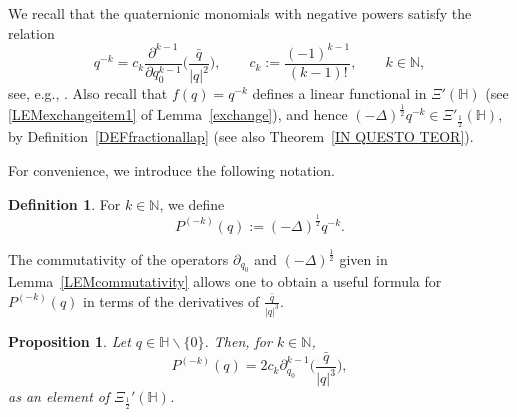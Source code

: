\documentclass[reqno,11pt]{amsart}
\newtheorem{proposition}[theorem]{Proposition}
\theoremstyle{definition}
\newtheorem{definition}[theorem]{Definition}
\begin{document}
We recall that the quaternionic monomials with negative powers satisfy the relation
\begin{equation}
	\label{negative2}
	q^{-k}= c_k \frac{\partial^{k-1}}{\partial q_0^{k-1}} \bigg( \frac{\bar{q}}{|q|^2}\bigg), \qquad c_k := \frac{(-1)^{k-1}}{(k-1)!}, \qquad k\in \mathbb{N},
\end{equation}
see, e.g., \cite{Q, TaoQian1}. Also recall that $f(q)=q^{-k}$ defines a linear functional in $\Xi'(\mathbb{H})$ (see \ref{LEMexchangeitem1} of Lemma~\ref{exchange}), and hence $(-\Delta)^{\frac{1}{2}} q^{-k}\in \Xi'_{\frac{1}{2}}(\mathbb{H})$, by Definition~\ref{DEFfractionallap} (see also Theorem~\ref{IN QUESTO TEOR}).



For convenience, we introduce the following notation.


\begin{definition}
For $k \in \mathbb{N}$, we define
\begin{equation*}
	P^{(-k)}(q):=(-\Delta)^{\frac{1}{2}} q^{-k}.
\end{equation*}
\end{definition}













The commutativity of the operators $\partial_{q_0}$ and $ (-\Delta)^{\frac{1}{2}}$ given in Lemma~\ref{LEMcommutativity} allows one to obtain a useful formula for $P^{(-k)}(q)$ in terms of the derivatives of $\frac{\bar{q}}{|q|^3}$.


\begin{proposition}
	\label{negative3}
	Let $q \in \mathbb{H}\backslash \{0\}$. Then, for $k\in \mathbb{N}$,
	\begin{equation}
		\label{Pk}
		P^{(-k)}(q)=2  c_k\partial_{q_0}^{k-1}\bigg( \frac{\bar{q}}{|q|^{3}}\bigg),
	\end{equation}
	as an element of $\Xi_{\frac{1}{2}}'(\mathbb{H})$.
\end{proposition}
\end{document}
